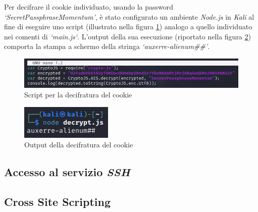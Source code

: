 Per decifrare il cookie individuato, usando la password \emph{`SecretPassphraseMomentum'}, è stato configurato un ambiente \emph{Node.js} in \emph{Kali} al fine di eseguire uno script (illustrato nella figura \ref{fig:decrypt}) analogo a quello individuato nei comenti di \emph{`main.js`}. L'output della sua esecuzione (riportato nella figura \ref{fig:decrypted}) comporta la stampa a schermo della stringa \emph{`auxerre-alienum\#\#'}.  
\begin{figure}[h]
    \centering
    \includegraphics[scale=0.6]{capitoli/images/decrypt.png}
    \caption{Script per la decifratura del cookie}
    \label{fig:decrypt}
\end{figure}
\begin{figure}[h]
    \centering
    \includegraphics[scale=1]{capitoli/images/decrypted.png}
    \caption{Output della decifratura del cookie}
    \label{fig:decrypted}
\end{figure}
\subsection{Accesso al servizio \emph{SSH}}
\subsection{Cross Site Scripting}